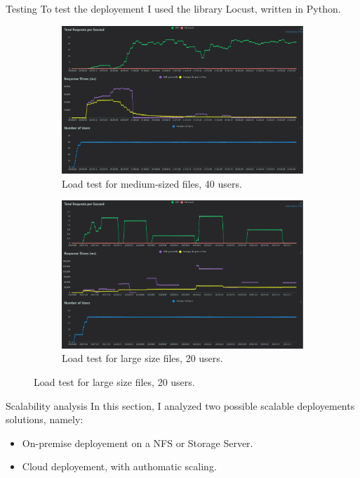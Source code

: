 \documentclass[11pt]{beamer}
\begin{document}
\begin{frame}{Testing}
	To test the deployement I used the library Locust, written in Python.
	\begin{figure}[h]
		\begin{subfigure}{0.4\textwidth}
		\centering
		\includegraphics[width=0.95\linewidth]{../report/total_requests_per_second_40user1mb}
		\caption{Load test for medium-sized files, 40 users.}
		\end{subfigure}
		\begin{subfigure}{0.45\textwidth}
		\label{fig:totalrequestspersecond40user1mb}
		\includegraphics[width=0.9\linewidth]{../report/response_times_(ms)_20users_1gb}
		\caption{Load test for large size files, 20 users.}
		\label{fig:responsetimesms20users1gb}
		\end{subfigure}
	\end{figure}
\end{frame}

\begin{frame}{Scalability analysis}
	In this section, I analyzed two possible scalable deployements solutions, namely:
	\begin{itemize}
		\item On-premise deployement on a NFS or Storage Server.
		\item Cloud deployement, with authomatic scaling.
	\end{itemize}
\end{frame}
\end{document}

